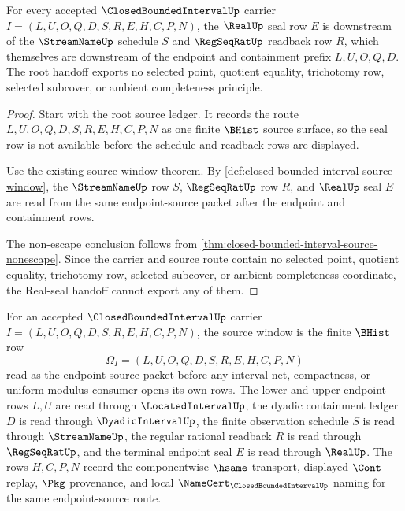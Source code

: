 \begin{theorem}
\label{thm:closed-bounded-interval-real-seal-root-handoff}
For every accepted $\ClosedBoundedIntervalUp$ carrier $I=(L,U,O,Q,D,S,R,E,H,C,P,N)$, the $\RealUp$ seal row $E$ is downstream of the $\StreamNameUp$ schedule $S$ and $\RegSeqRatUp$ readback row $R$, which themselves are downstream of the endpoint and containment prefix $L,U,O,Q,D$. The root handoff exports no selected point, quotient equality, trichotomy row, selected subcover, or ambient completeness principle.
\end{theorem}
\begin{proof}
Start with the root source ledger. It records the route $L,U,O,Q,D,S,R,E,H,C,P,N$ as one finite $\BHist$ source surface, so the seal row is not available before the schedule and readback rows are displayed.

Use the existing source-window theorem. By \autoref{def:closed-bounded-interval-source-window}, the $\StreamNameUp$ row $S$, $\RegSeqRatUp$ row $R$, and $\RealUp$ seal $E$ are read from the same endpoint-source packet after the endpoint and containment rows.

The non-escape conclusion follows from \autoref{thm:closed-bounded-interval-source-nonescape}. Since the carrier and source route contain no selected point, quotient equality, trichotomy row, selected subcover, or ambient completeness coordinate, the Real-seal handoff cannot export any of them.
\end{proof}



\begin{definition}
\label{def:closed-bounded-interval-source-window}
For an accepted $\ClosedBoundedIntervalUp$ carrier $I=(L,U,O,Q,D,S,R,E,H,C,P,N)$, the source window is the finite $\BHist$ row
$$
\Omega_I=(L,U,O,Q,D,S,R,E,H,C,P,N)
$$
read as the endpoint-source packet before any interval-net, compactness, or uniform-modulus consumer opens its own rows. The lower and upper endpoint rows $L,U$ are read through $\LocatedIntervalUp$, the dyadic containment ledger $D$ is read through $\DyadicIntervalUp$, the finite observation schedule $S$ is read through $\StreamNameUp$, the regular rational readback $R$ is read through $\RegSeqRatUp$, and the terminal endpoint seal $E$ is read through $\RealUp$. The rows $H,C,P,N$ record the componentwise $\hsame$ transport, displayed $\Cont$ replay, $\Pkg$ provenance, and local $\NameCert_{\ClosedBoundedIntervalUp}$ naming for the same endpoint-source route.
\end{definition}

